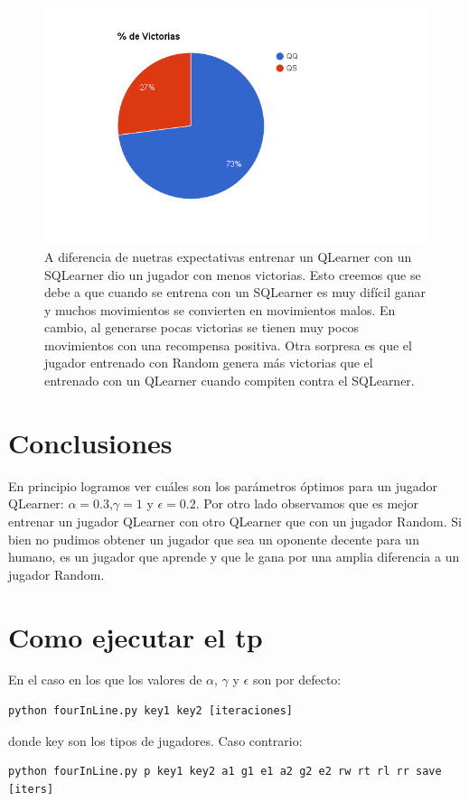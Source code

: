 \documentclass[10pt, a4paper]{article}
\begin{document}
\begin{figure}[H]
\begin{minipage}[c]{1\textwidth}
  \includegraphics[scale=0.3]{QQvsQS.png}
  \caption{A diferencia de nuetras expectativas entrenar un QLearner con un SQLearner dio un jugador con menos victorias. Esto creemos que se debe a que cuando se entrena con un SQLearner es muy difícil ganar y muchos movimientos se convierten en movimientos malos. En cambio, al generarse pocas victorias se tienen muy pocos movimientos con una recompensa positiva.
  Otra sorpresa es que el jugador entrenado con Random genera más victorias que el entrenado con un QLearner cuando compiten contra el SQLearner.}
  \end{minipage}
\end{figure}



\section{Conclusiones}
En principio logramos ver cuáles son los parámetros óptimos para un jugador QLearner: $\alpha=0.3$,$\gamma=1$ y $\epsilon=0.2$.
Por otro lado observamos que es mejor entrenar un jugador QLearner con otro QLearner que con un jugador Random.
Si bien no pudimos obtener un jugador que sea un oponente decente para un humano, es un jugador que aprende y que le gana por una amplia diferencia a un jugador Random.


\section{Como ejecutar el tp}


En el caso en los que los valores de $\alpha$, $\gamma$ y $\epsilon$ son por defecto:
\begin{lstlisting}
python fourInLine.py key1 key2 [iteraciones]  
\end{lstlisting}
donde key son los tipos de jugadores. Caso contrario: \\
\begin{lstlisting}
python fourInLine.py p key1 key2 a1 g1 e1 a2 g2 e2 rw rt rl rr save [iters]
\end{lstlisting}
\end{document}

